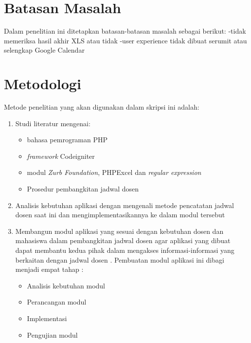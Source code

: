 \section{Batasan Masalah}
\label{sec:batasan}
Dalam penelitian ini ditetapkan batasan-batasan masalah sebagai berikut:
-tidak memeriksa hasil akhir XLS atau tidak
-user experience tidak dibuat serumit atau selengkap Google Calendar

\section{Metodologi}
\label{sec:metlit}
Metode penelitian yang akan digunakan dalam skripsi ini adalah:
\begin{enumerate}
   \item Studi literatur mengenai:
   		\begin{itemize}
 		\item bahasa pemrograman PHP
 		\item \textit{framework} Codeigniter
 		\item modul \textit{Zurb Foundation}, PHPExcel dan \textit{regular expression}
 		\item Prosedur pembangkitan jadwal dosen
		\end{itemize}
   \item Analisis kebutuhan aplikasi dengan mengenali metode pencatatan jadwal dosen saat ini dan mengimplementasikannya ke dalam modul tersebut
    \item Membangun modul aplikasi yang sesuai dengan kebutuhan dosen dan mahasiswa dalam pembangkitan jadwal dosen agar aplikasi yang dibuat dapat membantu kedua pihak dalam mengakses informasi-informasi yang berkaitan dengan jadwal dosen . Pembuatan modul aplikasi ini dibagi menjadi empat tahap :
    	\begin{itemize}
 		\item Analisis kebutuhan modul 
 		\item Perancangan modul
 		\item Implementasi 
 		\item Pengujian modul
		\end{itemize}
\end{enumerate}
 

